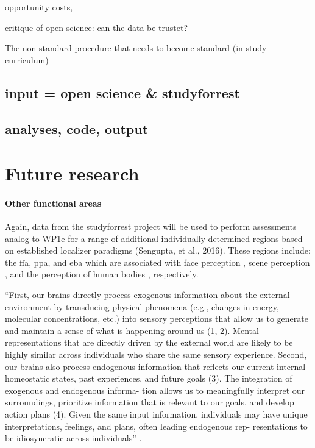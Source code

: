 
opportunity costs,

critique of open science: can the data be trustet?

%
The non-standard procedure that needs to become standard (in study curriculum)

\subsection{input = open science \& studyforrest}

\subsection{analyses, code, output}



\section{Future research}

\paragraph{Other functional areas}

Again, data from the studyforrest project will be used to perform assessments
analog to WP1e for a range of additional individually determined regions based
on established localizer paradigms (Sengupta, et al., 2016).
%
These regions include: the \ac{ffa}, \ac{ppa}, and \ac{eba}  which are
associated with face perception \citep{kanwisher1997ffa,
pitcher2011occipitalfacearea}, scene perception \citep{epstein1998ppa}, and the
perception of human bodies \citep{downing2001bodyarea}, respectively.

``First, our brains directly process exogenous information about the external
environment by transducing physical phenomena (e.g., changes in energy,
molecular concentrations, etc.) into sensory perceptions that allow us to
generate and maintain a sense of what is happening around us (1, 2). Mental
representations that are directly driven by the external world are likely to be
highly similar across individuals who share the same sensory experience. Second,
our brains also process endogenous information that reflects our current
internal homeostatic states, past experiences, and future goals (3). The
integration of exogenous and endogenous informa- tion allows us to meaningfully
interpret our surroundings, prioritize information that is relevant to our
goals, and develop action plans (4). Given the same input information,
individuals may have unique interpretations, feelings, and plans, often leading
endogenous rep- resentations to be idiosyncratic across individuals''
\citep{chang2021endogenous}.

